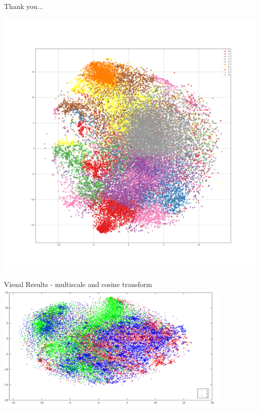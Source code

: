 \documentclass[usenames,dvipsnames]{beamer}
\begin{document}
\begin{frame}
    Thank you...
\end{frame}





\begin{frame}
  \includegraphics[width=\textwidth]{imagenes_cnn/Tsne_alpha90_cluster10.png}
\end{frame}



\begin{frame}{Visual Results - multiscale and cosine transform}
\centering
\includegraphics[width=0.85\textwidth]{imagenes/all.png}
\end{frame}
\end{document}
